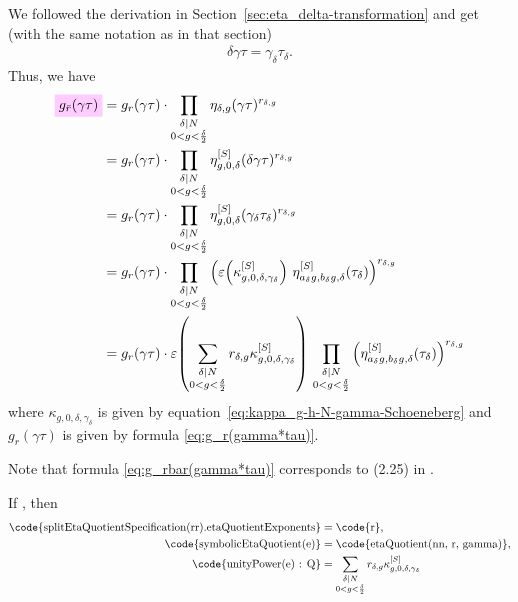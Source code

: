 \documentclass{article}
\begin{document}
We followed the derivation in
Section~\ref{sec:eta_delta-transformation} and get (with the same
notation as in that section)
\begin{gather*}
  \delta\gamma\tau = \gamma_\delta \tau_\delta.
\end{gather*}
Thus, we have
\begin{align}
  \defineNotation[g-rbar-gamma-tau]{g_{\bar{r}}(\gamma\tau)}
  &=
    g_r(\gamma\tau)
    \cdot
    \prod_{\substack{\divides{\delta}{N}\\0 < g < \frac{\delta}{2}}}
    \eta_{\delta,g}(\gamma\tau)^{r_{\delta,g}}
  \notag\\
  &=
    g_r(\gamma\tau)
    \cdot
    \prod_{\substack{\divides{\delta}{N}\\0 < g < \frac{\delta}{2}}}
    \eta_{g,0,\delta}^{[S]}(\delta\gamma\tau)^{r_{\delta,g}}
  \notag\\
  &=
    g_r(\gamma\tau)
    \cdot
    \prod_{\substack{\divides{\delta}{N}\\0 < g < \frac{\delta}{2}}}
    \eta_{g,0,\delta}^{[S]}(\gamma_\delta\tau_\delta)^{r_{\delta,g}}
  \notag\\
  &=
    g_r(\gamma\tau)
    \cdot
    \prod_{\substack{\divides{\delta}{N}\\0 < g < \frac{\delta}{2}}}
    \left(
      \unityPower{\kappa_{g,0,\delta,\gamma_\delta}^{[S]}}\,
      \eta_{a_\delta g, b_\delta g,\delta}^{[S]}(\tau_\delta)
  \right)^{r_{\delta,g}}
  \notag\\
  &=
    g_r(\gamma\tau)
    \cdot
    \unityPower{
      \sum_{\substack{\divides{\delta}{N}\\0 < g < \frac{\delta}{2}}}
        r_{\delta,g} \kappa_{g,0,\delta,\gamma_\delta}^{[S]}}\,
    \prod_{\substack{\divides{\delta}{N}\\0 < g < \frac{\delta}{2}}}
    \left(
      \eta_{a_\delta g, b_\delta g,\delta}^{[S]}(\tau_\delta)
  \right)^{r_{\delta,g}}
  \label{eq:g_rbar(gamma*tau)}
\end{align}
where $\kappa_{g,0,\delta,\gamma_\delta}$ is given by
equation~\eqref{eq:kappa_g-h-N-gamma-Schoeneberg} and
$g_r(\gamma\tau)$ is given by formula
\eqref{eq:g_r(gamma*tau)}.


Note that formula \eqref{eq:g_rbar(gamma*tau)} corresponds to (2.25)
in \cite{Chen+Du+Zhao:FindingModularFunctionsRamanujan:2019}.

If , then
\begin{align*}
  \text{\code{splitEtaQuotientSpecification(rr).etaQuotientExponents}}
  &=
    \text{\code{r}},
  \\
  \text{\code{symbolicEtaQuotient(e)}}
  &=
    \text{\code{etaQuotient(nn, r, gamma)}},
  \\
  \text{\code{unityPower(e) : Q}}
  &=
    \sum_{\substack{\divides{\delta}{N}\\0 < g < \frac{\delta}{2}}}
      r_{\delta,g} \kappa_{g,0,\delta,\gamma_\delta}^{[S]}
\end{align*}
\end{document}
